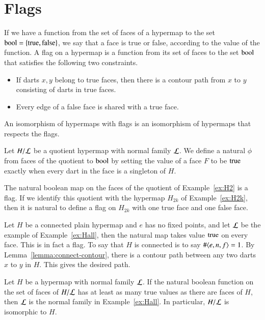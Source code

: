\section{Flags}

\begin{definition}  If we have a function from the set of faces of a hypermap
to the set ${\operatorname{bool}}=\{{\operatorname{true}},{\operatorname{false}}\}$, we say that a face is true or
false, according to the value of the function.  A flag on a hypermap
is a function from its set of faces to the set
${\operatorname{bool}}$ that satisfies the following two
constraints.
\begin{itemize}
    \item If darts $x,y$ belong to true faces,
    then there is a contour path from $x$ to $y$ consisting of darts
    in true faces.
    \item Every edge of a false face is shared with a true face.
    \end{itemize}
An isomorphism of hypermaps with flags is an isomorphism of
hypermaps that respects the flags.
\end{definition}

\begin{example} Let $H/{\cal L}$ be a quotient hypermap with
normal family $\cal L$.  We define
a natural $\phi$ from faces of the quotient to ${\operatorname{bool}}$ by setting
the value of a face $F$ to be ${\operatorname{true}}$ exactly when every dart in
the face is a singleton of $H$.
\end{example}

\begin{example} The natural boolean map on the faces of the
quotient of Example~\ref{ex:H2} is a flag.  If we identify this
quotient with the hypermap $H_{2k}$ of Example~\ref{ex:H2k}, 
then it is natural to define a flag
on $H_{2k}$ with one true face and one false face.
\end{example}

\begin{example} Let 
$H$ be a connected plain hypermap and $e$ has no fixed points,
and let $\cal L$ be the example of Example~\ref{ex:Hall}, 
then the natural
map takes value ${\operatorname{true}}$ on every face.  This is in fact a flag.
To say that $H$ is connected is to say $\#\langle e,n,f\rangle=1$. 
By Lemma~\ref{lemma:connect-contour}, there is a contour path between
any two darts $x$ to $y$ in $H$.  This gives the desired path.
\end{example}

\begin{lemma}  Let $H$ be a hypermap with normal family ${\cal L}$.
If the natural boolean function on the set of faces of
$H/{\cal L}$ has at least as many
true values as there are faces of $H$, then $\cal L$ is the normal family
in Example~\ref{ex:Hall}. In particular, $H/{\cal L}$ is isomorphic to $H$.
\end{lemma}

